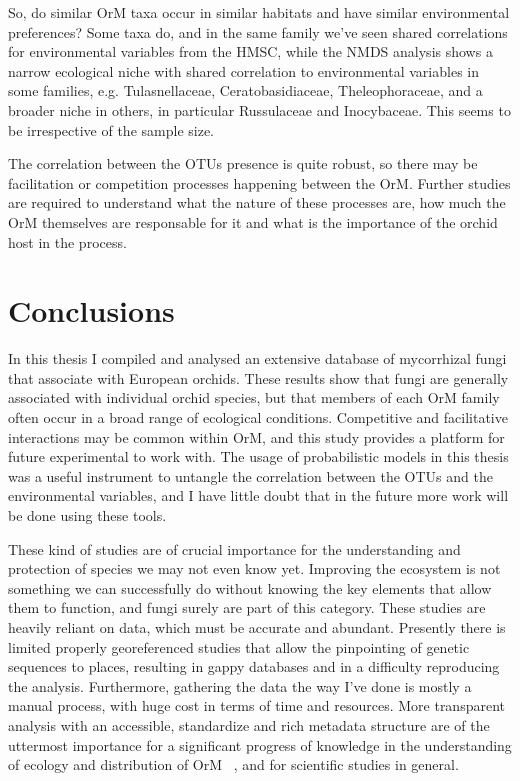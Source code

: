 So, do similar OrM taxa occur in similar habitats and have similar environmental preferences? Some taxa do, and in the same family we've seen shared correlations for environmental variables from the HMSC, while the NMDS analysis shows a narrow ecological niche with shared correlation to environmental variables in some families, e.g. Tulasnellaceae, Ceratobasidiaceae, Theleophoraceae, and a broader niche in others, in particular Russulaceae and Inocybaceae. This seems to be irrespective of the sample size.

The correlation between the OTUs presence is quite robust, so there may be facilitation or competition processes happening between the OrM. Further studies are required to understand what the nature of these processes are, how much the OrM themselves are responsable for it and what is the importance of the orchid host in the process.

\part{Conclusions}
\label{conclusions}

In this thesis I compiled and analysed an extensive database of mycorrhizal fungi that associate with European orchids. These results show that fungi are generally associated with individual orchid species, but that members of each OrM family often occur in a broad range of ecological conditions. Competitive and facilitative interactions may be common within OrM, and this study provides a platform for future experimental to work with. The usage of probabilistic models in this thesis was a useful instrument to untangle the correlation between the OTUs and the environmental variables, and I have little doubt that in the future more work will be done using these tools.

These kind of studies are of crucial importance for the understanding and protection of species we may not even know yet. Improving the ecosystem is not something we can successfully do without knowing the key elements that allow them to function, and fungi surely are part of this category. These studies are heavily reliant on data, which must be accurate and abundant. Presently there is limited properly georeferenced studies that allow the pinpointing of genetic sequences to places, resulting in gappy databases and in a difficulty reproducing the analysis.
Furthermore, gathering the data the way I've done is mostly a manual process, with huge cost in terms of time and resources. More transparent analysis with an accessible, standardize and rich metadata structure are of the uttermost importance for a significant progress of knowledge in the understanding of ecology and distribution of OrM ~\citep{powers2019}, and for scientific studies in general.


